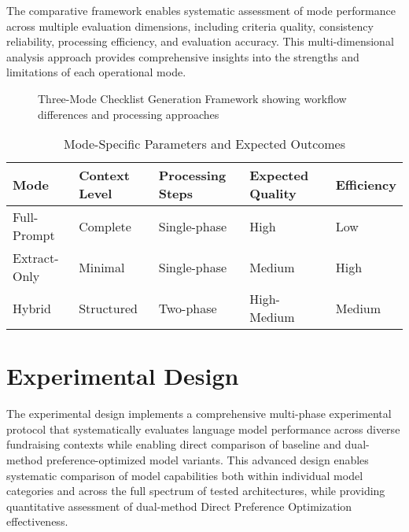 The comparative framework enables systematic assessment of mode performance across multiple evaluation dimensions, including criteria quality, consistency reliability, processing efficiency, and evaluation accuracy. This multi-dimensional analysis approach provides comprehensive insights into the strengths and limitations of each operational mode.

\begin{figure}[htbp]
    \centering
    \caption{Three-Mode Checklist Generation Framework showing workflow differences and processing approaches}
    \label{fig:three-mode-framework}
\end{figure}

\begin{table}[htbp]
    \centering
    \caption{Mode-Specific Parameters and Expected Outcomes}
    \label{tab:mode-parameters}
    \begin{tabular}{|l|l|l|l|l|}
    \hline
    \textbf{Mode} & \textbf{Context Level} & \textbf{Processing Steps} & \textbf{Expected Quality} & \textbf{Efficiency} \\
    \hline
    Full-Prompt & Complete & Single-phase & High & Low \\
    Extract-Only & Minimal & Single-phase & Medium & High \\
    Hybrid & Structured & Two-phase & High-Medium & Medium \\
    \hline
    \end{tabular}
\end{table}

\section{Experimental Design}
\label{sec:experimental-design}

The experimental design implements a comprehensive multi-phase experimental protocol that systematically evaluates language model performance across diverse fundraising contexts while enabling direct comparison of baseline and dual-method preference-optimized model variants. This advanced design enables systematic comparison of model capabilities both within individual model categories and across the full spectrum of tested architectures, while providing quantitative assessment of dual-method Direct Preference Optimization effectiveness.

